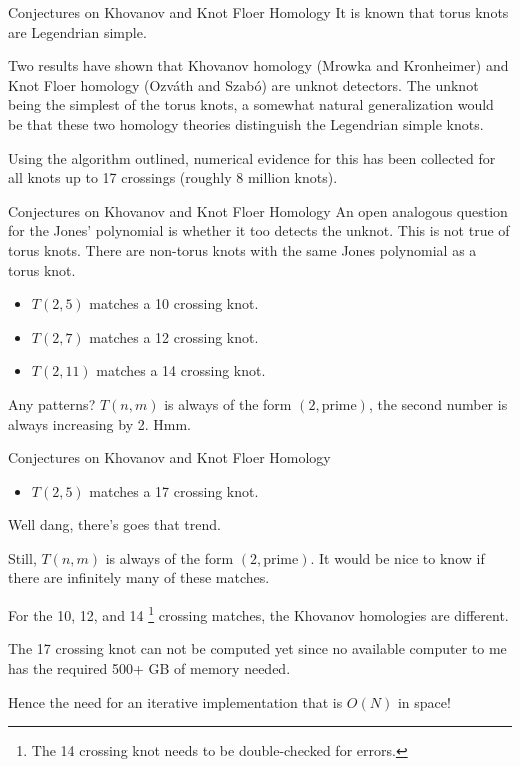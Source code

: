 \documentclass{beamer}
\begin{document}
    \begin{frame}{Conjectures on Khovanov and Knot Floer Homology}
        It is known that torus knots are Legendrian simple.
        \par\hfill\par
        Two results have shown that Khovanov homology (Mrowka and Kronheimer)
        and Knot Floer homology (Ozv\'{a}th and Szab\'{o}) are unknot detectors.
        The unknot being the simplest of the torus knots, a somewhat natural
        generalization would be that these two homology theories
        distinguish the Legendrian simple knots.
        \par\hfill\par
        Using the algorithm outlined, numerical evidence for this has been
        collected for all knots up to 17 crossings (roughly 8 million knots).
    \end{frame}
    \begin{frame}{Conjectures on Khovanov and Knot Floer Homology}
        An open analogous question for the Jones' polynomial is whether it too
        detects the unknot. This is not true of torus knots. There are
        non-torus knots with the same Jones polynomial as a torus knot.
        \begin{itemize}
            \item $T(2,5)$ matches a 10 crossing knot.
            \item $T(2,7)$ matches a 12 crossing knot.
            \item $T(2,11)$ matches a 14 crossing knot.
        \end{itemize}
        Any patterns? $T(n,m)$ is always of the form $(2,\text{prime})$,
        the second number is always increasing by 2. Hmm.
    \end{frame}
    \begin{frame}{Conjectures on Khovanov and Knot Floer Homology}
        \begin{itemize}
            \item $T(2,5)$ matches a 17 crossing knot.
        \end{itemize}
        Well dang, there's goes that trend.
        \par\hfill\par
        Still, $T(n,m)$ is always of the form $(2,\text{prime})$. It would
        be nice to know if there are infinitely many of these matches.
        \par\hfill\par
        For the 10, 12, and 14%
        \footnote{The 14 crossing knot needs to be double-checked for errors.}
        crossing matches, the Khovanov homologies are different.
        \par\hfill\par
        The 17 crossing knot can not be computed yet since no
        available computer to me has the required 500+ GB of memory needed.
        \par\hfill\par
        Hence the need for an iterative implementation that is $O(N)$ in space!
    \end{frame}
\end{document}
